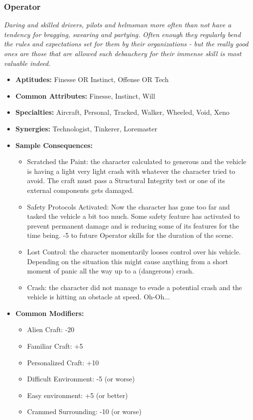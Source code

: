  \subsubsection{Operator}\label{Operator}
 \textit{Daring and skilled drivers, pilots and helmsman more often than not have a tendency for bragging, swearing and partying.
 Often enough they regularly bend the rules and expectations set for them by their organizations - but the really good ones are those that are allowed such debauchery for their immense skill is most valuable indeed.}
 \begin{itemize}
 	\item \textbf{Aptitudes:} Finesse OR Instinct, Offense OR Tech
 	\item \textbf{Common Attributes:} Finesse, Instinct, Will
 	\item \textbf{Specialties:} Aircraft, Personal, Tracked, Walker, Wheeled, Void, Xeno
 	\item \textbf{Synergies:} Technologist, Tinkerer, Loremaster
 	\item \textbf{Sample Consequences:} 
 	\begin{itemize}
 		\item Scratched the Paint: the character calculated to generous and the vehicle is having a light very light crash with whatever the character tried to avoid. The craft must pass a Structural Integrity test or one of its external components gets damaged.
 		\item Safety Protocols Activated: Now the character has gone too far and tasked the vehicle a bit too much. Some safety feature has activated to prevent permanent damage and is reducing some of its features for the time being. -5 to future Operator skills for the duration of the scene.
 		\item Lost Control: the character momentarily looses control over his vehicle. Depending on the situation this might cause anything from a short moment of panic all the way up to a (dangerous) crash.
 		\item Crash: the character did not manage to evade a potential crash and the vehicle is hitting an obstacle at speed. Oh-Oh...
 	\end{itemize}
 	\item \textbf{Common Modifiers:}
 	\begin{itemize}
 		\item Alien Craft: -20
 		\item Familiar Craft: +5
 		\item Personalized Craft: +10
 		\item Difficult Environment: -5 (or worse)
 		\item Easy environment: +5 (or better)
 		\item Crammed Surrounding: -10 (or worse)
 	\end{itemize}
 \end{itemize}

